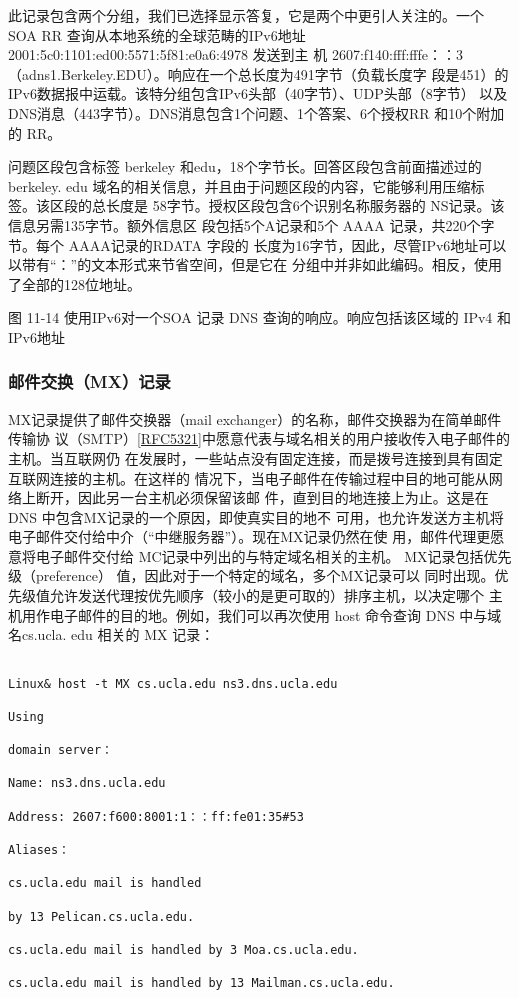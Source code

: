 此记录包含两个分组，我们已选择显示答复，它是两个中更引人关注的。一个 SOA RR
查询从本地系统的全球范畴的IPv6地址2001:5c0:1101:ed00:5571:5f81:e0a6:4978 发送到主
机 2607:f140:fff:fffe：：3 （adns1.Berkeley.EDU）。响应在一个总长度为491字节（负载长度字
段是451）的IPv6数据报中运载。该特分组包含IPv6头部（40字节）、UDP头部（8字节）
以及 DNS消息（443字节）。DNS消息包含1个问题、1个答案、6个授权RR 和10个附加
的 RR。

问题区段包含标签 berkeley 和edu，18个字节长。回答区段包含前面描述过的 berkeley.
edu 域名的相关信息，并且由于问题区段的内容，它能够利用压缩标签。该区段的总长度是
58字节。授权区段包含6个识别名称服务器的 NS记录。该信息另需135字节。额外信息区
段包括5个A记录和5个 AAAA 记录，共220个字节。每个 AAAA记录的RDATA 字段的
长度为16字节，因此，尽管IPv6地址可以以带有“：”的文本形式来节省空间，但是它在
分组中并非如此编码。相反，使用了全部的128位地址。

图 11-14 使用IPv6对一个SOA 记录 DNS 查询的响应。响应包括该区域的 IPv4 和 IPv6地址

\subsubsection{邮件交换（MX）记录}

MX记录提供了邮件交换器（mail exchanger）的名称，邮件交换器为在简单邮件传输协
议（SMTP）\href{https://www.rfc-editor.org/rfc/rfc5321}{[RFC5321]}中愿意代表与域名相关的用户接收传入电子邮件的主机。当互联网仍
在发展时，一些站点没有固定连接，而是拨号连接到具有固定互联网连接的主机。在这样的
情况下，当电子邮件在传输过程中目的地可能从网络上断开，因此另一台主机必须保留该邮
件，直到目的地连接上为止。这是在 DNS 中包含MX记录的一个原因，即使真实目的地不
可用，也允许发送方主机将电子邮件交付给中介（“中继服务器”）。现在MX记录仍然在使
用，邮件代理更愿意将电子邮件交付给 MC记录中列出的与特定域名相关的主机。
MX记录包括优先级（preference） 值，因此对于一个特定的域名，多个MX记录可以
同时出现。优先级值允许发送代理按优先顺序（较小的是更可取的）排序主机，以决定哪个
主机用作电子邮件的目的地。例如，我们可以再次使用 host 命令查询 DNS 中与域名cs.ucla.
edu 相关的 MX 记录：

\begin{verbatim}
    
Linux& host -t MX cs.ucla.edu ns3.dns.ucla.edu

Using

domain server：

Name: ns3.dns.ucla.edu

Address: 2607:f600:8001:1：：ff:fe01:35#53

Aliases：

cs.ucla.edu mail is handled

by 13 Pelican.cs.ucla.edu.

cs.ucla.edu mail is handled by 3 Moa.cs.ucla.edu.

cs.ucla.edu mail is handled by 13 Mailman.cs.ucla.edu.
\end{verbatim}

